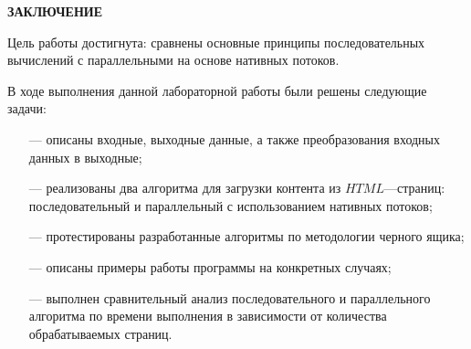 \begin{center}
    \textbf{ЗАКЛЮЧЕНИЕ}
\end{center}

Цель работы достигнута: сравнены основные принципы последовательных вычислений с параллельными на основе нативных потоков.

\vspace{5mm}

В ходе выполнения данной лабораторной работы были решены следующие задачи:
\begin{itemize}
	\item[---] описаны входные, выходные данные, а также преобразования входных данных в выходные;
	\item[---] реализованы два алгоритма для загрузки контента из $HTML$---страниц: последовательный и параллельный с использованием нативных потоков;
	\item[---] протестированы разработанные алгоритмы по методологии черного ящика;
    \item[---] описаны примеры работы программы на конкретных случаях;
    \item[---] выполнен сравнительный анализ последовательного и параллельного алгоритма по времени выполнения в зависимости от количества обрабатываемых страниц.
\end{itemize}